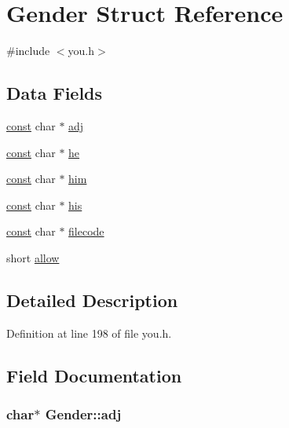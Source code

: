 \hypertarget{structGender}{\section{Gender Struct Reference}
\label{structGender}
}


{\ttfamily \#include $<$you.\+h$>$}

\subsection*{Data Fields}
\begin{DoxyCompactItemize}
\item 
\hyperlink{tradstdc_8h_a2c212835823e3c54a8ab6d95c652660e}{const} char $\ast$ \hyperlink{structGender_aa85b253df7182369faacf4a5ae6f99cb}{adj}
\item 
\hyperlink{tradstdc_8h_a2c212835823e3c54a8ab6d95c652660e}{const} char $\ast$ \hyperlink{structGender_a08a24c1dee5ae7dc45213067ef452df3}{he}
\item 
\hyperlink{tradstdc_8h_a2c212835823e3c54a8ab6d95c652660e}{const} char $\ast$ \hyperlink{structGender_aedc348cd8e5f9b588f88bd2ada63e556}{him}
\item 
\hyperlink{tradstdc_8h_a2c212835823e3c54a8ab6d95c652660e}{const} char $\ast$ \hyperlink{structGender_a7176a9ad4710377dea0b8396d91a0a05}{his}
\item 
\hyperlink{tradstdc_8h_a2c212835823e3c54a8ab6d95c652660e}{const} char $\ast$ \hyperlink{structGender_ad52dd3790c3551d8c3f4c169e8cb9f75}{filecode}
\item 
short \hyperlink{structGender_a2f19e03e12a099f1a27af9e2965d1cca}{allow}
\end{DoxyCompactItemize}


\subsection{Detailed Description}


Definition at line 198 of file you.\+h.



\subsection{Field Documentation}
\hypertarget{structGender_aa85b253df7182369faacf4a5ae6f99cb}{
\subsubsection[{adj}]{ char$\ast$ Gender\+::adj}}\label{structGender_aa85b253df7182369faacf4a5ae6f99cb}


